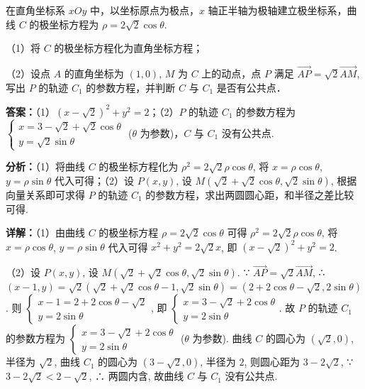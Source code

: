 \begin{question}[points=10]
[选修4-4：坐标系与参数方程]



在直角坐标系 $xOy$ 中，以坐标原点为极点，$x$ 轴正半轴为极轴建立极坐标系，曲线 $C$ 的极坐标方程为 $\rho = 2\sqrt{2}\cos\theta$.



（1）将 $C$ 的极坐标方程化为直角坐标方程；



（2）设点 $A$ 的直角坐标为 $(1,0)$, $M$ 为 $C$ 上的动点，点 $P$ 满足 $\overrightarrow{AP} = \sqrt{2}\overrightarrow{AM}$, 写出 $P$ 的轨迹 $C_1$ 的参数方程，并判断 $C$ 与 $C_1$ 是否有公共点．
\begin{solution}
\textbf{答案：}（1）$(x-\sqrt{2})^2 + y^2 = 2$；（2）$P$ 的轨迹 $C_1$ 的参数方程为 $\begin{cases} x = 3 - \sqrt{2} + \sqrt{2}\cos\theta \\ y = \sqrt{2}\sin\theta \end{cases}$ ($\theta$ 为参数)，$C$ 与 $C_1$ 没有公共点.

\textbf{分析：}（1）将曲线 $C$ 的极坐标方程化为 $\rho^2 = 2\sqrt{2}\rho\cos\theta$, 将 $x=\rho\cos\theta$, $y=\rho\sin\theta$ 代入可得；（2）设 $P(x,y)$, 设 $M(\sqrt{2}+\sqrt{2}\cos\theta, \sqrt{2}\sin\theta)$, 根据向量关系即可求得 $P$ 的轨迹 $C_1$ 的参数方程，求出两圆圆心距，和半径之差比较可得.

\textbf{详解：}（1）由曲线 $C$ 的极坐标方程 $\rho = 2\sqrt{2}\cos\theta$ 可得 $\rho^2 = 2\sqrt{2}\rho\cos\theta$, 将 $x=\rho\cos\theta$, $y=\rho\sin\theta$ 代入可得 $x^2+y^2 = 2\sqrt{2}x$, 即 $(x-\sqrt{2})^2 + y^2 = 2$.

（2）设 $P(x,y)$, 设 $M(\sqrt{2}+\sqrt{2}\cos\theta, \sqrt{2}\sin\theta)$. ∵ $\overrightarrow{AP} = \sqrt{2}\overrightarrow{AM}$, ∴ $(x-1, y) = \sqrt{2}(\sqrt{2}+\sqrt{2}\cos\theta - 1, \sqrt{2}\sin\theta) = (2+2\cos\theta - \sqrt{2}, 2\sin\theta)$. 则 $\begin{cases} x-1 = 2+2\cos\theta - \sqrt{2} \\ y = 2\sin\theta \end{cases}$, 即 $\begin{cases} x = 3 - \sqrt{2} + 2\cos\theta \\ y = 2\sin\theta \end{cases}$. 故 $P$ 的轨迹 $C_1$ 的参数方程为 $\begin{cases} x = 3 - \sqrt{2} + 2\cos\theta \\ y = 2\sin\theta \end{cases}$ ($\theta$ 为参数). 曲线 $C$ 的圆心为 $(\sqrt{2},0)$, 半径为 $\sqrt{2}$, 曲线 $C_1$ 的圆心为 $(3-\sqrt{2},0)$, 半径为 $2$, 则圆心距为 $3-2\sqrt{2}$, ∵ $3-2\sqrt{2} < 2 - \sqrt{2}$, ∴ 两圆内含, 故曲线 $C$ 与 $C_1$ 没有公共点.
\end{solution}
\end{question}

